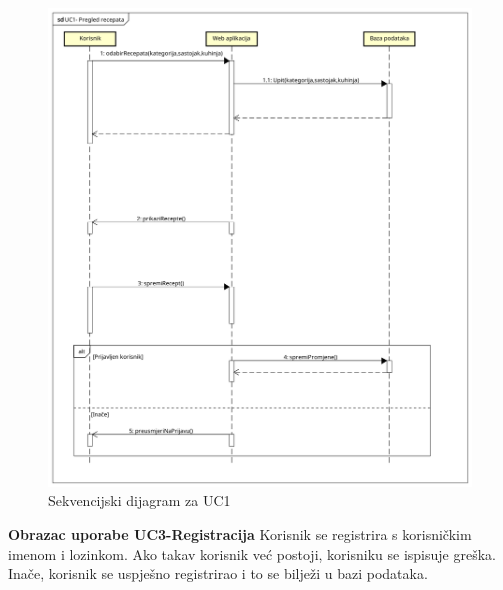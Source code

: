 				
				\begin{figure}[H]
					\includegraphics[scale= 0.4]{slike/sekvencijski_dijagramUC1.png}
					\centering
					\caption{Sekvencijski dijagram za UC1}
					\label{fig:Sekvencijski dijagram za UC1}
				\end{figure} 
				\eject
				
				\noindent
				\textbf{Obrazac uporabe UC3-Registracija}\newline
				{Korisnik se registrira s korisničkim imenom i lozinkom. Ako takav korisnik već postoji, korisniku se ispisuje greška. Inače, korisnik se uspješno registrirao i to se bilježi u bazi podataka.}
				
